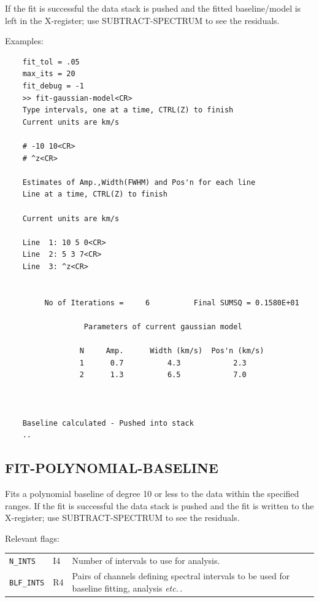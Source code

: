 \documentclass[11pt,twoside]{report}
\newcommand{\etc}{{\it etc.\,}}
\begin{document}
If the fit is successful the data stack is pushed and the fitted baseline/model
is left in the X-register; use SUBTRACT-SPECTRUM to see the residuals.

Examples:
\begin{verbatim}
    fit_tol = .05
    max_its = 20
    fit_debug = -1
    >> fit-gaussian-model<CR>
    Type intervals, one at a time, CTRL(Z) to finish
    Current units are km/s

    # -10 10<CR>
    # ^z<CR>

    Estimates of Amp.,Width(FWHM) and Pos'n for each line
    Line at a time, CTRL(Z) to finish

    Current units are km/s

    Line  1: 10 5 0<CR>
    Line  2: 5 3 7<CR>
    Line  3: ^z<CR>


         No of Iterations =     6          Final SUMSQ = 0.1580E+01

                  Parameters of current gaussian model

                 N     Amp.      Width (km/s)  Pos'n (km/s)
                 1      0.7          4.3            2.3
                 2      1.3          6.5            7.0



    Baseline calculated - Pushed into stack
    ..
\end{verbatim}

\subsection{FIT-POLYNOMIAL-BASELINE} 

Fits a polynomial baseline of degree 10 or less to the data within the
specified ranges. If the fit is successful the data stack is pushed and
the fit is written to the X-register; use SUBTRACT-SPECTRUM to see the
residuals.

Relevant flags:\\
\begin{tabular}{lll}
  \verb+N_INTS+     & I4 & Number of intervals to use for analysis.\\
  \verb+BLF_INTS+   & R4 & \parbox[t]{4in}
                           {Pairs of channels defining spectral intervals to
                            be used for baseline fitting, analysis \etc.}
\end{tabular}
\end{document}
